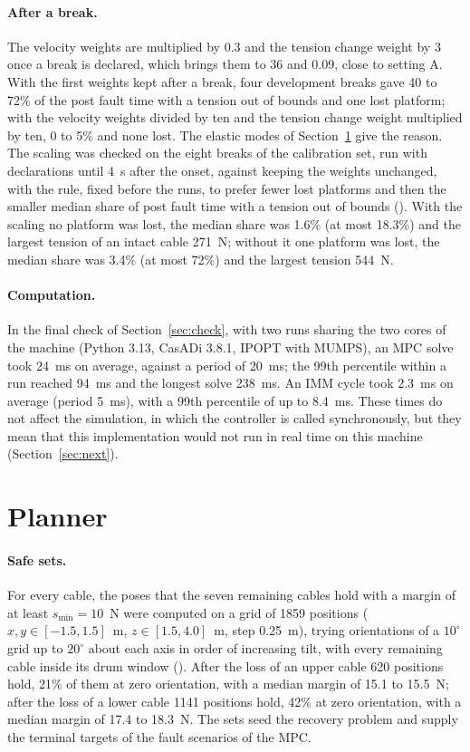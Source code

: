 \documentclass[10pt]{article}
\begin{document}
\paragraph{After a break.} The velocity weights are multiplied by 0.3 and the tension change weight by 3 once a break is declared, which brings them to 36 and 0.09, close to setting A. With the first weights kept after a break, four development breaks gave 40 to 72\% of the post fault time with a tension out of bounds and one lost platform; with the velocity weights divided by ten and the tension change weight multiplied by ten, 0 to 5\% and none lost. The elastic modes of Section~\ref{sec:planner} give the reason. The scaling was checked on the eight breaks of the calibration set, run with declarations until 4~s after the onset, against keeping the weights unchanged, with the rule, fixed before the runs, to prefer fewer lost platforms and then the smaller median share of post fault time with a tension out of bounds (). With the scaling no platform was lost, the median share was 1.6\% (at most 18.3\%) and the largest tension of an intact cable 271~N; without it one platform was lost, the median share was 3.4\% (at most 72\%) and the largest tension 544~N.

\paragraph{Computation.} In the final check of Section~\ref{sec:check}, with two runs sharing the two cores of the machine (Python 3.13, CasADi 3.8.1, IPOPT with MUMPS), an MPC solve took 24~ms on average, against a period of 20~ms; the 99th percentile within a run reached 94~ms and the longest solve 238~ms. An IMM cycle took 2.3~ms on average (period 5~ms), with a 99th percentile of up to 8.4~ms. These times do not affect the simulation, in which the controller is called synchronously, but they mean that this implementation would not run in real time on this machine (Section~\ref{sec:next}).

\section{Planner}\label{sec:planner}

\paragraph{Safe sets.} For every cable, the poses that the seven remaining cables hold with a margin of at least $s_{\min}=10$~N were computed on a grid of 1859 positions ($x,y\in[-1.5,1.5]$~m, $z\in[1.5,4.0]$~m, step 0.25~m), trying orientations of a $10^\circ$ grid up to $20^\circ$ about each axis in order of increasing tilt, with every remaining cable inside its drum window (). After the loss of an upper cable 620 positions hold, 21\% of them at zero orientation, with a median margin of 15.1 to 15.5~N; after the loss of a lower cable 1141 positions hold, 42\% at zero orientation, with a median margin of 17.4 to 18.3~N. The sets seed the recovery problem and supply the terminal targets of the fault scenarios of the MPC.
\end{document}
